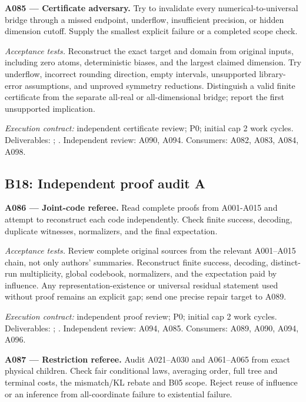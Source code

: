 \documentclass[11pt]{article}
\begin{document}
\textbf{A085 --- Certificate adversary.} Try to invalidate every numerical-to-universal bridge through a missed endpoint, underflow, insufficient precision, or hidden dimension cutoff. Supply the smallest explicit failure or a completed scope check.

\emph{Acceptance tests.} Reconstruct the exact target and domain from original inputs, including zero atoms, deterministic biases, and the largest claimed dimension. Try underflow, incorrect rounding direction, empty intervals, unsupported library-error assumptions, and unproved symmetry reductions. Distinguish a valid finite certificate from the separate all-real or all-dimensional bridge; report the first unsupported implication.

{\small\emph{Execution contract:} independent certificate review; P0; initial cap 2 work cycles. Deliverables: ; . Independent review: A090, A094. Consumers: A082, A083, A084, A098.}

\subsection{B18: Independent proof audit A}

\textbf{A086 --- Joint-code referee.} Read complete proofs from A001-A015 and attempt to reconstruct each code independently. Check finite success, decoding, duplicate witnesses, normalizers, and the final expectation.

\emph{Acceptance tests.} Review complete original sources from the relevant A001--A015 chain, not only authors' summaries. Reconstruct finite success, decoding, distinct-run multiplicity, global codebook, normalizers, and the expectation paid by influence. Any representation-existence or universal residual statement used without proof remains an explicit gap; send one precise repair target to A089.

{\small\emph{Execution contract:} independent proof review; P0; initial cap 2 work cycles. Deliverables: ; . Independent review: A094, A085. Consumers: A089, A090, A094, A096.}

\textbf{A087 --- Restriction referee.} Audit A021--A030 and A061--A065 from exact physical children. Check fair conditional laws, averaging order, full tree and terminal costs, the mismatch/KL rebate and B05 scope. Reject reuse of influence or an inference from all-coordinate failure to existential failure.
\end{document}

